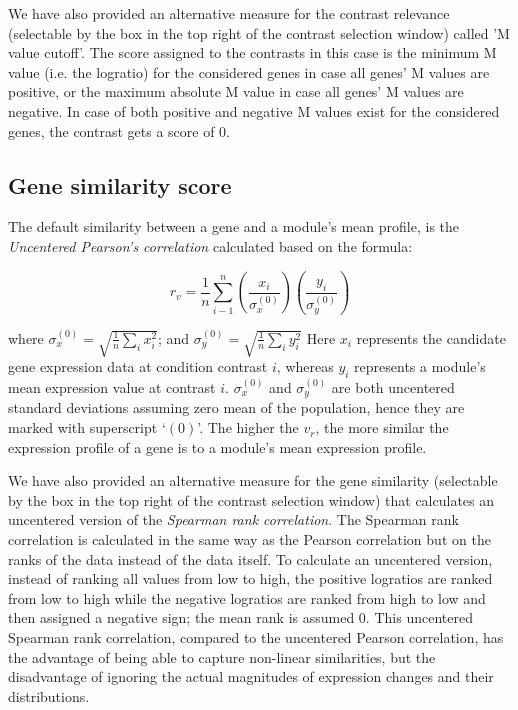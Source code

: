 We have also provided an alternative measure for the contrast
relevance (selectable by the box in the top right of the contrast
selection window) called 'M value cutoff'.  The score assigned to
the contrasts in this case is the minimum M value (i.e. the
logratio) for the considered genes in case all genes' M values
are positive, or the maximum absolute M value in case all genes'
M values are negative.  In case of both positive and negative M
values exist for the considered genes, the contrast gets a score
of 0.



\subsection{Gene similarity score}\label{apd:gene-score}

The default similarity between a gene and a module's mean
profile, is the \textit{Uncentered Pearson’s correlation} calculated based
on the formula:

\begin{equation}
r_v=\frac{1}{n}\sum_{i-1}^n(\dfrac{x_i}{\sigma_x^{(0)}})(\dfrac{y_i}{\sigma_y^{(0)}})
\end{equation}

where $\textstyle\sigma_x^{(0)}=\sqrt{\frac{1}{n}\sum\limits_{i}x_i^2}$; and 
$\textstyle\sigma_y^{(0)}=\sqrt{\frac{1}{n}\sum\limits_{i}y_i^2}$
Here $x_i$ represents the candidate gene expression data at
condition contrast $i$, whereas $y_i$ represents a module’s mean
expression value at contrast $i$. $\sigma_x^{(0)}$ and
$\sigma_y^{(0)}$ are both uncentered standard deviations assuming
zero mean of the population, hence they are marked with
superscript ‘$(0)$’. The higher the $v_r$, the more similar the
expression profile of a gene is to a module’s mean expression
profile.

We have also provided an alternative measure for the gene
similarity (selectable by the box in the top right of the
contrast selection window) that calculates an uncentered version
of the \textit{Spearman rank correlation}. The Spearman rank correlation
is calculated in the same way as the Pearson correlation but on
the ranks of the data instead of the data itself. To calculate an
uncentered version, instead of ranking all values from low to
high, the positive logratios are ranked from low to high while
the negative logratios are ranked from high to low and then
assigned a negative sign; the mean rank is assumed $0$.  This
uncentered Spearman rank correlation, compared to the uncentered
Pearson correlation, has the advantage of being able to capture
non-linear similarities, but the disadvantage of ignoring the
actual magnitudes of expression changes and their distributions.

